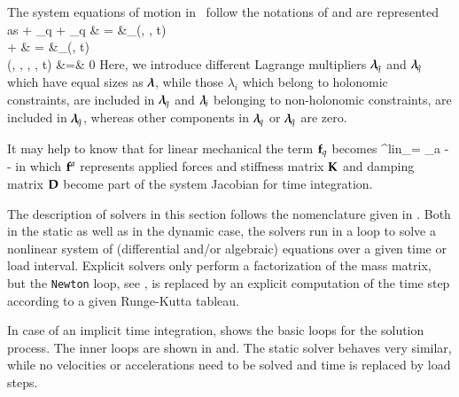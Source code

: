 The system equations of motion in \codeName\ follow the notations of  and are represented as 
\bea \label{eq_system_EOM}
  \Mm \ddot \qv +  \tlambda_q + 
                   \tlambda_{\dot q}
                  & = &\fv_\SO(\qv, \dot \qv, t) \\
  \dot \yv +  \tlambda & = &\fv_\FO(\yv, t) \\
  \gv(\qv, \dot \qv, \yv, \tlambda, t) &=& 0 \eqDot
\eea
Here, we introduce different Lagrange multipliers $\mbox{\boldmath $\lambda$ \unboldmath}\!\!_q$ and $\mbox{\boldmath $\lambda$ \unboldmath}\!\!_{\dot q}$ which have equal sizes as $\mbox{\boldmath $\lambda$ \unboldmath}\!\!$, while those $\lambda_i$ which belong to holonomic constraints, are included in $\mbox{\boldmath $\lambda$ \unboldmath}\!\!_q$ and $\mbox{\boldmath $\lambda$ \unboldmath}\!\!_i$ belonging to non-holonomic constraints, are included in $\mbox{\boldmath $\lambda$ \unboldmath}\!\!_{\dot q}$, whereas other components in $\mbox{\boldmath $\lambda$ \unboldmath}\!\!_q$ or $\mbox{\boldmath $\lambda$ \unboldmath}\!\!_{\dot q}$ are zero.

It may help to know that for linear mechanical the term $\mathbf{f}_q$ becomes
\be
  \fv^{lin}_\SO = \fv_a - \Km \qv - \Dm \dot \qv
\ee
in which $\mathbf{f}^a$ represents applied forces and stiffness matrix $\mathbf{K}$ and damping matrix $\mathbf{D}$ become part of the system Jacobian for time integration.

The description of solvers in this section follows the nomenclature given in .
Both in the static as well as in the dynamic case, the solvers run in a loop to solve a nonlinear system of (differential and/or algebraic) equations over a given time or load interval. Explicit solvers only perform a factorization of the mass matrix, but the \texttt{Newton} loop, see , is replaced by an explicit computation of the time step according to a given Runge-Kutta tableau.

In case of an implicit time integration,  shows the basic loops for the solution process. The inner loops are shown in  and.
The static solver behaves very similar, while no velocities or accelerations need to be solved and time is replaced by load steps.

